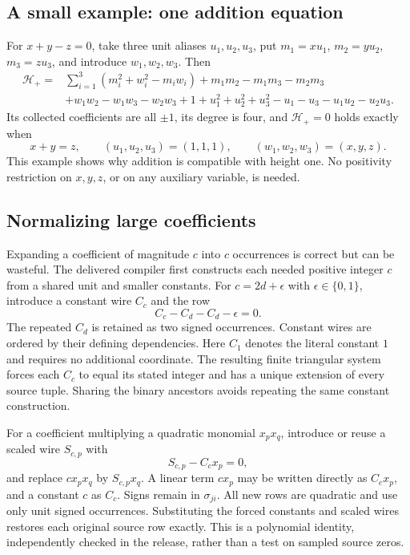 \subsection{A small example: one addition equation}

For $x+y-z=0$, take three unit aliases $u_1,u_2,u_3$, put
$m_1=xu_1$, $m_2=yu_2$, $m_3=zu_3$, and introduce $w_1,w_2,w_3$.
Then
\begin{align*}
\mathcal H_{+}={}&\sum_{i=1}^3(m_i^2+w_i^2-m_iw_i)
 +m_1m_2-m_1m_3-m_2m_3\\
 &+w_1w_2-w_1w_3-w_2w_3
 +1+u_1^2+u_2^2+u_3^2-u_1-u_3-u_1u_2-u_2u_3.
\end{align*}
Its collected coefficients are all $\pm1$, its degree is four, and
$\mathcal H_+=0$ holds exactly when
\[
 x+y=z,\qquad (u_1,u_2,u_3)=(1,1,1),\qquad(w_1,w_2,w_3)=(x,y,z).
\]
This example shows why addition is compatible with height one. No
positivity restriction on $x,y,z$, or on any auxiliary variable, is
needed.

\subsection{Normalizing large coefficients}\label{sec:binary-normalization}

Expanding a coefficient of magnitude $c$ into $c$ occurrences is correct
but can be wasteful. The delivered compiler first constructs each needed
positive integer $c$ from a shared unit and smaller constants. For
$c=2d+\epsilon$ with $\epsilon\in\{0,1\}$, introduce a constant wire
$C_c$ and the row
\begin{equation}
 C_c-C_d-C_d-\epsilon=0.
 \label{eq:binary-constant}
\end{equation}
The repeated $C_d$ is retained as two signed occurrences. Constant wires
are ordered by their defining dependencies. Here $C_1$ denotes the
literal constant $1$ and requires no additional coordinate. The resulting
finite triangular system forces each
$C_c$ to equal its stated integer and has a unique extension of every
source tuple. Sharing the binary ancestors avoids repeating the same
constant construction.

For a coefficient multiplying a quadratic monomial $x_p x_q$, introduce
or reuse a scaled wire $S_{c,p}$ with
\begin{equation}
 S_{c,p}-C_c x_p=0,
 \label{eq:scaled-wire}
\end{equation}
and replace $c x_p x_q$ by $S_{c,p}x_q$. A linear term $c x_p$ may
be written directly as $C_c x_p$, and a constant $c$ as $C_c$.
Signs remain in $\sigma_{ji}$. All new rows are quadratic and use only
unit signed occurrences. Substituting the forced constants and scaled
wires restores each original source row exactly. This is a polynomial
identity, independently checked in the release, rather than a test on
sampled source zeros.

